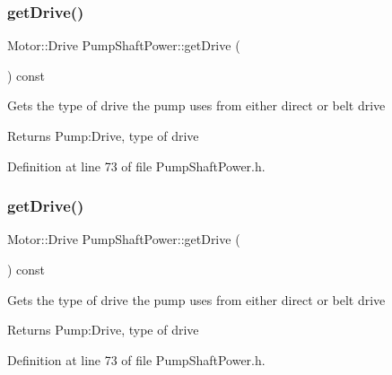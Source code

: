 \subsubsection{\texorpdfstring{get\+Drive()}{getDrive()}\hspace{0.1cm}{\footnotesize\ttfamily [2/3]}}
{\footnotesize\ttfamily Motor\+::\+Drive Pump\+Shaft\+Power\+::get\+Drive (\begin{DoxyParamCaption}{ }\end{DoxyParamCaption}) const\hspace{0.3cm}{\ttfamily [inline]}}

Gets the type of drive the pump uses from either direct or belt drive \begin{DoxyReturn}{Returns}
Pump\+:Drive, type of drive 
\end{DoxyReturn}


Definition at line 73 of file Pump\+Shaft\+Power.\+h.

\mbox{\label{class_pump_shaft_power_a382653196fd65562cd3823049ab7573a}} 
\subsubsection{\texorpdfstring{get\+Drive()}{getDrive()}\hspace{0.1cm}{\footnotesize\ttfamily [3/3]}}
{\footnotesize\ttfamily Motor\+::\+Drive Pump\+Shaft\+Power\+::get\+Drive (\begin{DoxyParamCaption}{ }\end{DoxyParamCaption}) const\hspace{0.3cm}{\ttfamily [inline]}}

Gets the type of drive the pump uses from either direct or belt drive \begin{DoxyReturn}{Returns}
Pump\+:Drive, type of drive 
\end{DoxyReturn}


Definition at line 73 of file Pump\+Shaft\+Power.\+h.

\mbox{\label{class_pump_shaft_power_acb91eadb960f946ffee5373d4839a5be}} 
